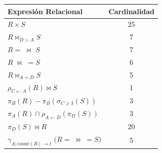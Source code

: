 \begin{center}
\begin{tabular}{lc}
\toprule
\textbf{Expresión Relacional} & \textbf{Cardinalidad} \\
\midrule
$R \times S$ & 25 \\
$R \bowtie_{D > A} S$ & 7 \\
$R=$ $\mathrel{\!\!\bowtie}$ $S$  & 7 \\
$R$ $\mathrel{\bowtie\!\!}$ $=S$ & 6 \\
$R \bowtie_{A = D} S$ & 5 \\
$\rho_{C \leftarrow A} (R) \bowtie S$ & 1 \\
$\pi_B (R) - \pi_B (\sigma_{C \ge 3} (S))$ & 3 \\
$\pi_A (R) \cap \rho_{A \leftarrow D} (\pi_D (S))$ & 3 \\
$\pi_D (S) \bowtie R$ & 20 \\
$\gamma_{A; \text{count}(B) \rightarrow t}$ $(R=$ $\mathrel{\!\!\bowtie\!\!}$ $=S)$ & 5 \\
\bottomrule
\end{tabular}
\end{center}


